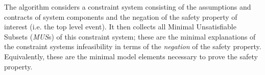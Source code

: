 The \aivcalg algorithm considers a constraint system consisting of the assumptions and contracts of system components and the negation of the safety property of interest (i.e. the top level event). It then collects all Minimal Unsatisfiable Subsets (\textit{MUS}s) of this constraint system; these are the minimal explanations of the constraint systems infeasibility in terms of the \textit{negation} of the safety property. Equivalently, these are the minimal model elements necessary to prove the safety property.%





